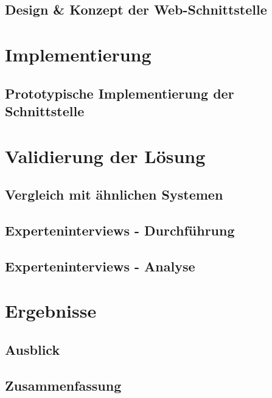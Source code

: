 \documentclass[draft,final]{vutinfth} %
\begin{document}
\section{Design \& Konzept der Web-Schnittstelle}



\chapter{Implementierung}

\section{Prototypische Implementierung der Schnittstelle}



\chapter{Validierung der Lösung}

\section{Vergleich mit ähnlichen Systemen}

\section{Experteninterviews - Durchführung}

\section{Experteninterviews - Analyse}



\chapter{Ergebnisse}

\section{Ausblick}

\section{Zusammenfassung}


\end{document}
